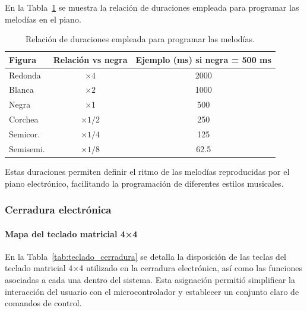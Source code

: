 En la Tabla~\ref{tab:figuras_piano} se muestra la relación de duraciones empleada para programar las melodías en el piano.

\begin{table}[H]
\centering
\begin{tabular}{|l|c|c|}
\hline
\textbf{Figura} & \textbf{Relación vs negra} & \textbf{Ejemplo (ms) si negra = 500 ms} \\
\hline
Redonda  & $\times 4$   & 2000 \\
Blanca   & $\times 2$   & 1000 \\
Negra    & $\times 1$   & 500 \\
Corchea  & $\times 1/2$ & 250 \\
Semicor. & $\times 1/4$ & 125 \\
Semisemi. & $\times 1/8$ & 62.5 \\
\hline
\end{tabular}
\caption{Relación de duraciones empleada para programar las melodías.}
\label{tab:figuras_piano}
\end{table}

Estas duraciones permiten definir el ritmo de las melodías reproducidas por el piano electrónico, facilitando la programación de diferentes estilos musicales.

\newpage

\subsubsection{Cerradura electrónica}

\paragraph{Mapa del teclado matricial 4×4}

En la Tabla~\ref{tab:teclado_cerradura} se detalla la disposición de las teclas del teclado matricial 4×4 utilizado en la cerradura electrónica, 
así como las funciones asociadas a cada una dentro del sistema.  
Esta asignación permitió simplificar la interacción del usuario con el microcontrolador y establecer un conjunto claro de comandos de control.

\begin{table}[H]
\centering
{}
\caption{Distribución y funciones asignadas a cada tecla del teclado matricial 4×4. Fuente: elaboración propia.}
\label{tab:teclado_cerradura}
\end{table}


